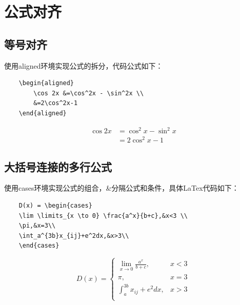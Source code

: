 \section{公式对齐}

\subsection{等号对齐}

使用aligned环境实现公式的拆分，代码公式如下：

\begin{lstlisting}
    \begin{aligned}
        \cos 2x &=\cos^2x - \sin^2x \\
        &=2\cos^2x-1
    \end{aligned}
\end{lstlisting}

\[
    \begin{aligned}
        \cos 2x &=\cos^2x - \sin^2x \\
        &=2\cos^2x-1
        \end{aligned}
\]

\subsection{大括号连接的多行公式}

使用cases环境实现公式的组合，\&分隔公式和条件，具体LaTex代码如下：

\begin{lstlisting}
    D(x) = \begin{cases}
    \lim \limits_{x \to 0} \frac{a^x}{b+c},&x<3 \\
    \pi,&x=3\\
    \int_a^{3b}x_{ij}+e^2dx,&x>3\\
    \end{cases}
\end{lstlisting}

\[
    D(x) = \begin{cases}
    \lim \limits_{x \to 0} \frac{a^x}{b+c},&x<3 \\
    \pi,&x=3\\
    \int_a^{3b}x_{ij}+e^2dx,&x>3\\
    \end{cases}
\]
